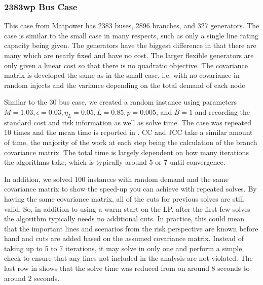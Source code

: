 \subsubsection*{2383wp Bus Case}
This case from Matpower has 2383 buses, 2896 branches, and 327 generators.  The case is similar to the small case in many respects, such as only a single line rating capacity being given.  The generators have the biggest difference in that there are many which are nearly fixed and have no cost.  The larger flexible generators are only given a linear cost so that there is no quadratic objective.  The covariance matrix is developed the same as in the small case, i.e. with no covariance in random injects and the variance depending on the total demand of each node

Similar to the 30 bus case, we created a random instance using parameters $M=1.03, \epsilon=0.03, \eta_L=0.05, L=0.85, p=0.005$, and $B=1$ and recording the standard cost and risk information as well as solve time.  The case was repeated 10 times and the mean time is reported in .  CC and JCC take a similar amount of time, the majority of the work at each step being the calculation of the branch covariance matrix.  The total time is largely dependent on how many iterations the algorithms take, which is typically around 5 or 7 until convergence. 

In addition, we solved 100 instances with random demand and the same covariance matrix to show the speed-up you can achieve with repeated solves.  By having the same covariance matrix, all of the cuts for previous solves are still valid.  So, in addition to using a warm start on the LP, after the first few solves the algorithm typically needs no additional cuts.  In practice, this could mean that the important lines and scenarios from the risk perspective are known before hand and cuts are added based on the assumed covariance matrix.  Instead of taking up to 5 to 7 iterations, it may solve in only one and perform a simple check to ensure that any lines not included in the analysis are not violated.  The last row in  shows that the solve time was reduced from on around 8 seconds to around 2 seconds.

